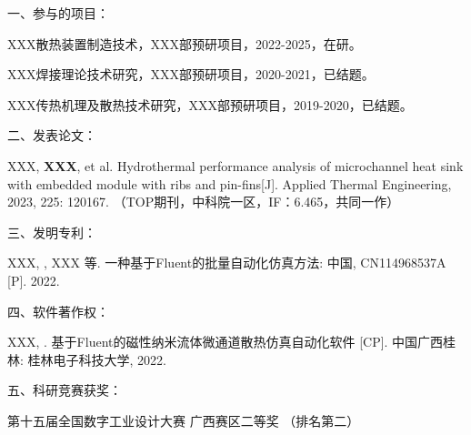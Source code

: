 
\noindent %
一、参与的项目：
\begingroup
\setlength{\itemsep}{0bp}\setlength{\parskip}{0pt}\small
    \begin{enumerate}[label={[\arabic*]}] %
        \item XXX散热装置制造技术，XXX部预研项目，2022-2025，在研。
        \item XXX焊接理论技术研究，XXX部预研项目，2020-2021，已结题。
        \item XXX传热机理及散热技术研究，XXX部预研项目，2019-2020，已结题。
        \end{enumerate}
\endgroup
\vspace{3mm}

\noindent %
二、发表论文：
\begingroup
\setlength{\itemsep}{0bp}\setlength{\parskip}{0pt}\small
    \begin{enumerate}[label={[\arabic*]}] 
        \item XXX, {\bfseries{XXX}}, et al. Hydrothermal performance analysis of microchannel heat sink with embedded module with ribs and pin-fins[J]. Applied Thermal Engineering, 2023, 225: 120167. （TOP期刊，中科院一区，IF：6.465，共同一作）
    \end{enumerate}
\endgroup
\vspace{3mm}

\noindent %
三、发明专利：
\begingroup
\setlength{\itemsep}{0bp}\setlength{\parskip}{0pt}\small
    \begin{enumerate}[label={[\arabic*]}]  
        \item XXX, , XXX 等. 一种基于Fluent的批量自动化仿真方法: 中国, CN114968537A [P]. 2022. 
    \end{enumerate}
\endgroup
\vspace{3mm}

\noindent %
四、软件著作权：
\begingroup
\setlength{\itemsep}{0bp}\setlength{\parskip}{0pt}\small
    \begin{enumerate}[label={[\arabic*]}]  
        \item XXX, . 基于Fluent的磁性纳米流体微通道散热仿真自动化软件 [CP]. 中国广西桂林: 桂林电子科技大学, 2022.
    \end{enumerate}
\endgroup
\vspace{3mm}

\noindent %
五、科研竞赛获奖：
\begingroup
    \setlength{\itemsep}{0bp}\setlength{\parskip}{0pt}\small
    \begin{enumerate}[label={[\arabic*]}]  
        \item 第十五届全国数字工业设计大赛 广西赛区二等奖 （排名第二）   
    \end{enumerate}
\endgroup


